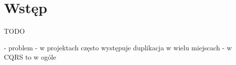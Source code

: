 \chapter{Wstęp} \label{chap:intro}

TODO

- problem
 - w projektach często występuje duplikacja w wielu miejscach
 - w CQRS to w ogóle
 